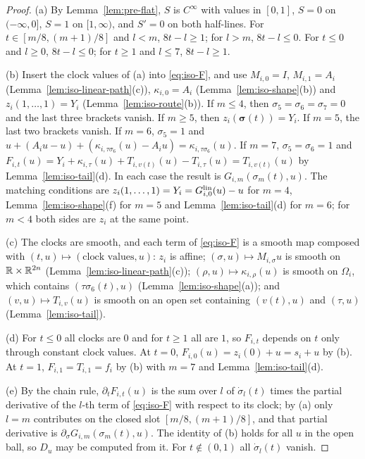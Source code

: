 \begin{proof}
(a) By Lemma~\ref{lem:pre-flat}, $S$ is $C^\infty$ with values in $[0,1]$, $S=0$ on $(-\infty,0]$, $S=1$ on $[1,\infty)$, and $S'=0$
on both half-lines. For $t\in[m/8,(m+1)/8]$ and $l<m$, $8t-l\ge1$; for $l>m$, $8t-l\le0$. For $t\le0$ and $l\ge0$, $8t-l\le0$; for
$t\ge1$ and $l\le7$, $8t-l\ge1$.

(b) Insert the clock values of (a) into \eqref{eq:iso-F}, and use $M_{i,0}=I$, $M_{i,1}=A_i$ (Lemma~\ref{lem:iso-linear-path}(c)),
$\kappa_{i,0}=A_i$ (Lemma~\ref{lem:iso-shape}(b)) and $z_i(1,\dots,1)=Y_i$ (Lemma~\ref{lem:iso-route}(b)). If $m\le4$, then
$\sigma_5=\sigma_6=\sigma_7=0$ and the last three brackets vanish. If $m\ge5$, then $z_i(\boldsymbol\sigma(t))=Y_i$. If $m=5$, the last two
brackets vanish. If $m=6$, $\sigma_5=1$ and $u+(A_iu-u)+(\kappa_{i,\tau\sigma_6}(u)-A_iu)=\kappa_{i,\tau\sigma_6}(u)$. If $m=7$,
$\sigma_5=\sigma_6=1$ and $F_{i,t}(u)=Y_i+\kappa_{i,\tau}(u)+T_{i,v(t)}(u)-T_{i,\tau}(u)=T_{i,v(t)}(u)$ by
Lemma~\ref{lem:iso-tail}(d). In each case the result is $G_{i,m}(\sigma_m(t),u)$. The matching conditions are
$z_i(1,\dots,1)=Y_i=G^{\rm lin}_{i,0}(u)-u$ for $m=4$, Lemma~\ref{lem:iso-shape}(f) for $m=5$ and Lemma~\ref{lem:iso-tail}(d) for
$m=6$; for $m<4$ both sides are $z_i$ at the same point.

(c) The clocks are smooth, and each term of \eqref{eq:iso-F} is a smooth map composed with $(t,u)\mapsto(\text{clock values},u)$:
$z_i$ is affine; $(\sigma,u)\mapsto M_{i,\sigma}u$ is smooth on $\mathbb{R}\times\mathbb{R}^{2n}$ (Lemma~\ref{lem:iso-linear-path}(c));
$(\rho,u)\mapsto\kappa_{i,\rho}(u)$ is smooth on $\Omega_i$, which contains $(\tau\sigma_6(t),u)$ (Lemma~\ref{lem:iso-shape}(a)); and
$(v,u)\mapsto T_{i,v}(u)$ is smooth on an open set containing $(v(t),u)$ and $(\tau,u)$ (Lemma~\ref{lem:iso-tail}).

(d) For $t\le0$ all clocks are $0$ and for $t\ge1$ all are $1$, so $F_{i,t}$ depends on $t$ only through constant clock values.
At $t=0$, $F_{i,0}(u)=z_i(0)+u=s_i+u$ by (b). At $t=1$, $F_{i,1}=T_{i,1}=f_i$ by (b) with $m=7$ and Lemma~\ref{lem:iso-tail}(d).

(e) By the chain rule, $\partial_tF_{i,t}(u)$ is the sum over $l$ of $\dot\sigma_l(t)$ times the partial derivative of the $l$-th term of
\eqref{eq:iso-F} with respect to its clock; by (a) only $l=m$ contributes on the closed slot $[m/8,(m+1)/8]$, and that partial
derivative is $\partial_\sigma G_{i,m}(\sigma_m(t),u)$. The identity of (b) holds for all $u$ in the open ball, so $D_u$ may be computed
from it. For $t\notin(0,1)$ all $\dot\sigma_l(t)$ vanish.
\end{proof}

